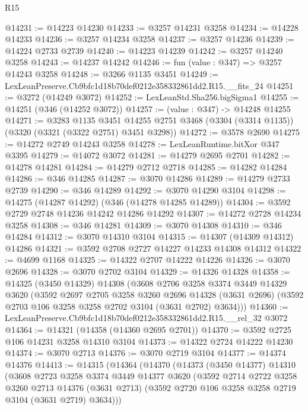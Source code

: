 \begin{lexlean}{R15}
\begin{coremodule}
@14231 := @14223 @14230
@14233 := @3257 @14231 @3258
@14234 := @14228 @14233
@14236 := @3257 @14234 @3258
@14237 := @3257 @14236
@14239 := @14224 @2733 @2739
@14240 := @14223 @14239
@14242 := @3257 @14240 @3258
@14243 := @14237 @14242
@14246 := fun (value : @347) => @3257 @14243 @3258
@14248 := @3266 @1135 @3451
@14249 := LexLeanPreserve.Cb9bfc1d18b70def0212e358332861dd2.R15.__fits_24
@14251 := @3272 (@14249 @3072)
@14252 := LexLeanStd.Sha256.bigSigma1
@14255 := @14251 (@346 (@14252 @3072))
@14257 := (value : @347) -> @14248 @14255
@14271 := @3283
    @1135
    @3451
    @14255
    @2751
    @3468
    (@3304 (@3314 @1135))
    (@3320 (@3321 (@3322 @2751) @3451 @3298))
@14272 := @3578 @2690
@14275 := @14272 @2749 @14243 @3258
@14278 := LexLeanRuntime.bitXor @347 @3395
@14279 := @14072 @3072
@14281 := @14279 @2695 @2701
@14282 := @14278 @14281
@14284 := @14279 @2712 @2718
@14285 := @14282 @14284
@14286 := @346 @14285
@14287 := @3070 @14286
@14289 := @14279 @2733 @2739
@14290 := @346 @14289
@14292 := @3070 @14290 @3104
@14298 := @14275 (@14287 @14292) (@346 (@14278 @14285 @14289))
@14304 := @3592 @2729 @2748 @14236 @14242 @14286 @14292
@14307 := @14272 @2728 @14234 @3258
@14308 := @346 @14281
@14309 := @3070 @14308
@14310 := @346 @14284
@14312 := @3070 @14310 @3104
@14315 := @14307 (@14309 @14312) @14286
@14321 := @3592 @2708 @2727 @14227 @14233 @14308 @14312
@14322 := @4699 @1168
@14325 := @14322 @2707 @14222 @14226
@14326 := @3070 @2696
@14328 := @3070 @2702 @3104
@14329 := @14326 @14328
@14358 := @14325
    (@3450 @14329)
    @14308
    (@3608
      @2706
      @3258
      @3374
      @3449
      @14329
      @3620
      (@3592
        @2697
        @2705
        @3258
        @3260
        @2696
        @14328
        (@3631 @2696)
        (@3592 @2703 @106 @3258 @3258 @2702 @3104 (@3631 @2702) @3634)))
@14360 := LexLeanPreserve.Cb9bfc1d18b70def0212e358332861dd2.R15.__rel_32 @3072
@14364 := @14321 (@14358 (@14360 @2695 @2701))
@14370 := @3592 @2725 @106 @14231 @3258 @14310 @3104
@14373 := @14322 @2724 @14222 @14230
@14374 := @3070 @2713
@14376 := @3070 @2719 @3104
@14377 := @14374 @14376
@14413 := @14315
    (@14364
      (@14370
        (@14373
          (@3450 @14377)
          @14310
          (@3608
            @2723
            @3258
            @3374
            @3449
            @14377
            @3620
            (@3592
              @2714
              @2722
              @3258
              @3260
              @2713
              @14376
              (@3631 @2713)
              (@3592 @2720 @106 @3258 @3258 @2719 @3104 (@3631 @2719) @3634)))

\end{coremodule}
\end{lexlean}
